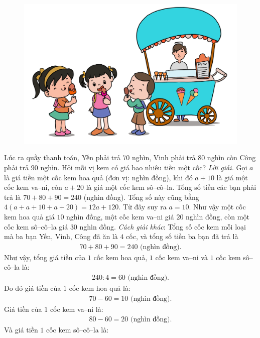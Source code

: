 \begin{multicols}{2}
\begin{figure}[H]
		\vspace*{-10pt}
		\captionsetup{labelformat= empty, justification=centering}
		\includegraphics[width=0.92\linewidth]{bai2}
		\vspace*{-10pt}
	\end{figure}
	Lúc ra quầy thanh toán, Yến phải trả $70$ nghìn, Vinh phải trả $80$ nghìn còn Công phải trả $90$ nghìn. Hỏi mỗi vị kem có giá bao nhiêu tiền một cốc?
	\vskip 0.1cm
	\textit{Lời giải.} 	Gọi $a$ là giá tiền một cốc kem hoa quả (đơn vị: nghìn đồng), khi đó $a+10$ là giá một cốc kem va--ni, còn $a+20$ là giá một cốc kem sô--cô--la. Tổng số tiền các bạn phải trả là $70+80+90= 240$ (nghìn đồng). Tổng số này cũng bằng $4(a+a+10+a+20)= 12 a+ 120$.
	\vskip 0.1cm 
	Từ đây suy ra $a= 10$.
	\vskip 0.1cm 
	Như vậy một cốc kem hoa quả giá $10$ nghìn đồng, một cốc kem va--ni giá $20$ nghìn đồng, còn một cốc kem sô--cô--la giá $30$ nghìn đồng. 
	\vskip 0.1cm
	\textit{Cách giải khác}: Tổng số cốc kem mỗi loại mà ba bạn Yến, Vinh, Công đã ăn là $4$ cốc, và tổng số tiền ba bạn đã trả là 
	\begin{align*}
		70 + 80 +90 = 240 \text{ (nghìn đồng).}
	\end{align*}
	Như vậy, tổng giá tiền của $1$ cốc kem hoa quả, $1$ cốc kem va--ni và $1$ cốc kem sô--cô--la là:
	\begin{align*}
		240 : 4=60 \text{ (nghìn đồng).}
	\end{align*}
	Do đó giá tiền của $1$ cốc kem hoa quả là:
	\begin{align*}
		70-60 = 10 \text{ (nghìn đồng).}
	\end{align*}
	Giá tiền của $1$ cốc kem va--ni là:
	\begin{align*}
		80-60 = 20 \text{ (nghìn đồng).}
	\end{align*}
	Và giá tiền $1$ cốc kem sô--cô--la là:

\end{multicols}
